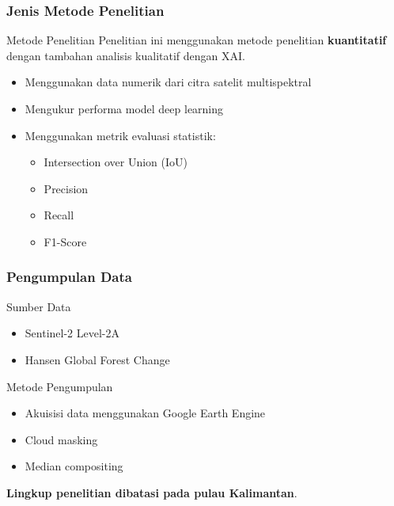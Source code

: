 \documentclass{beamer}
\begin{document}
	\begin{frame}
		\frametitle{Jenis Metode Penelitian}
		
		\begin{block}{Metode Penelitian}
			Penelitian ini menggunakan metode penelitian 
			\textbf{kuantitatif} dengan tambahan analisis kualitatif dengan XAI.
		\end{block}
		
		\vspace{0.3cm}
		
		\begin{itemize}
			\item Menggunakan data numerik dari citra satelit multispektral
			\item Mengukur performa model deep learning
			\item Menggunakan metrik evaluasi statistik:
			\begin{itemize}
				\item Intersection over Union (IoU)
				\item Precision
				\item Recall
				\item F1-Score
			\end{itemize}
		\end{itemize}
		
		\vspace{0.3cm}
	\end{frame}
	
	\begin{frame}
		\frametitle{Pengumpulan Data}
		
		\begin{block}{Sumber Data}
			\begin{itemize}
				\item Sentinel-2 Level-2A
				\item Hansen Global Forest Change
			\end{itemize}
		\end{block}
		
		\vspace{0.3cm}
		
		\begin{block}{Metode Pengumpulan}
			\begin{itemize}
				\item Akuisisi data menggunakan Google Earth Engine
				\item Cloud masking
				\item Median compositing
			\end{itemize}
		\end{block}
		
		\textbf{Lingkup penelitian dibatasi pada pulau Kalimantan}.
		
	\end{frame}
	
\end{document}
